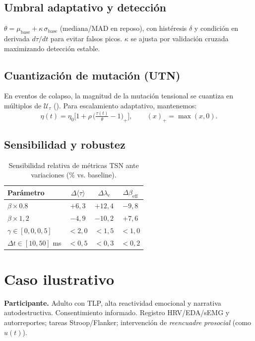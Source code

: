 \documentclass[10pt,a4paper,twocolumn]{article}
\theoremstyle{definition}
\theoremstyle{plain}
\begin{document}
\subsection{Umbral adaptativo y detección}
\(\theta = \mu_{\mathrm{base}} + \kappa\,\sigma_{\mathrm{base}}\) (mediana/MAD en reposo), con histéresis \(\delta\) y condición en derivada \(d\tau/dt\) para evitar falsos picos. \(\kappa\) se ajusta por validación cruzada maximizando detección estable.

\subsection{Cuantización de mutación (UTN)}
En eventos de colapso, la magnitud de la mutación tensional se cuantiza en múltiplos de \(\mathcal{U}_\tau\) (). Para escalamiento adaptativo, mantenemos:
\begin{equation}
\eta(t) = \eta_0 \Big[1 + \rho\,\big(\tfrac{\tau(t)}{\theta}-1\big)_+\Big],\qquad (x)_+=\max(x,0).
\label{eq:eta_adaptativo}
\end{equation}

\subsection{Sensibilidad y robustez}
\begin{table}[H]\centering\small
\caption{Sensibilidad relativa de métricas TSN ante variaciones (\% vs. baseline).}
\label{tab:sensibilidad}
\begin{tabular}{@{}lccc@{}}
\toprule
\textbf{Parámetro} & $\Delta \langle\tau\rangle$ & $\Delta \lambda_c$ & $\Delta \beta_{\mathrm{eff}}$ \\ \midrule
$\beta \times 0.8$ & $+6,3$ & $+12,4$ & $-9,8$ \\
$\beta \times 1,2$ & $-4,9$ & $-10,2$ & $+7,6$ \\
$\gamma \in [0{,}0, 0{,}5]$ & $<2{,}0$ & $<1{,}5$ & $<1{,}0$ \\
$\Delta t \in [10,50]$ ms & $<0{,}5$ & $<0{,}3$ & $<0{,}2$ \\ \bottomrule
\end{tabular}
\end{table}

\section{Caso ilustrativo}
\textbf{Participante.} Adulto con TLP, alta reactividad emocional y narrativa autodestructiva. Consentimiento informado. Registro HRV/EDA/sEMG y autorreportes; tareas Stroop/Flanker; intervención de \emph{reencuadre prosocial} (como \(u(t)\)).
\end{document}
